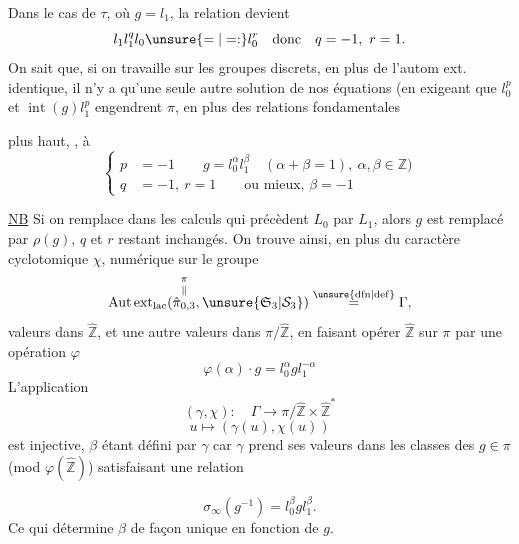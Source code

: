 Dans le cas de $\tau$, où $g=l_1$, la relation devient
\[
l_1l_1^ql_0\unsure{=|=:}l_0^r\quad\text{donc}\quad q=-1,\ r=1.
\]
On sait que, si on travaille sur les groupes discrets, en plus de l'autom ext. identique, il n'y a qu'une seule autre solution de nos équations (en exigeant  que $l_0^p$ et $\operatorname{int}(g)l_1^p$ engendrent $\pi$, en plus des relations fondamentales

plus haut,  ,   à
\[
\left\{\begin{aligned}
p&=-1\qquad g=l_0^\alpha l_1^\beta\quad(\alpha+\beta=1),\ \alpha,\beta\in\mathbb Z)\\
q&=-1,\ r=1\qquad\text{ou mieux, }\beta=-1
\end{aligned}\right.
\]

\uline{NB} Si on remplace dans les calculs qui précèdent $L_0$ par $L_1$, alors $g$ est remplacé par $\rho(g)$, $q$ et $r$ restant inchangés. On trouve ainsi, en plus du caractère cyclotomique $\chi$,    numérique \inserted{\uline{$\beta$},} sur le groupe
\[
\operatorname{Aut\,ext}_{\mathrm{lac}}(\overset{\pi}{\overset{\Vert}{\hat\pi_{0,3}}},\unsure{\mathfrak S_3|\mathcal S_3})\overset{\unsure{\mathrm{dfn}|\mathrm{def}}}=\Gamma,
\]
  valeurs dans $\hat{\mathbb Z}$, et une autre \inserted{$\gamma$}  valeurs dans $\pi/\hat{\mathbb Z}$, en faisant opérer $\hat{\mathbb Z}$ sur $\pi$ par une opération $\varphi$
\[
\varphi(\alpha)\cdot g=l_0^\alpha gl_1^{-\alpha}
\]
L'application
\[
(\gamma,\chi):\quad\Gamma\longrightarrow\pi/\hat{\mathbb Z}\times\hat{\mathbb Z}^{*}
\]
\[
u\longmapsto(\gamma(u),\chi(u))
\]
\margin{\uline{NB} \inserted{$\gamma_0:\mathcal E_0\longrightarrow\pi$} est un $1$. cocycle sur $\mathcal E_0\unsure{=|\simeq}\operatorname{Aut}_{\mathrm{lac}}(\pi,L_0)$, [\deleted{\unsure{groupe|fixant}} \inserted{qui définit} le ss-gr. des éléments qui commutent ext. à $\unsure{\mathfrak S_3|\mathcal S_3}$}
est injective,  $\beta$ étant défini par $\gamma$ car $\gamma$ prend ses valeurs dans les classes des $g\in\pi$ (mod $\varphi(\hat{\mathbb Z})$) satisfaisant une relation

\[
\sigma_\infty(g^{-1})=l_0^\beta g l_1^\beta.
\]
Ce qui détermine $\beta$ de façon unique en fonction de $g$.

